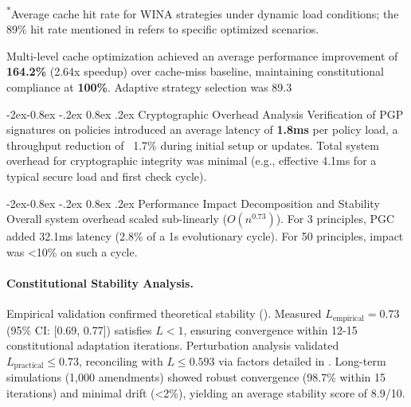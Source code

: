 \documentclass[manuscript,screen,9pt]{acmart}
\makeatletter
\renewcommand\subsubsection{\@startsection{subsubsection}{3}{\z@}%
  {-2ex\@plus -0.8ex \@minus -.2ex}%
  {0.8ex \@plus .2ex}%
  {\normalfont\normalsize\bfseries}}
\makeatother
\begin{document}
\begin{table}[!htb]
\begin{table}[htbp]
\begin{minipage}{\linewidth}\footnotesize \textsuperscript{*}Average cache hit rate for WINA strategies under dynamic load conditions; the 89\% hit rate mentioned in  refers to specific optimized scenarios.\end{minipage}
\end{table}
Multi-level cache optimization achieved an average performance improvement of \textbf{164.2\%} (2.64x speedup) over cache-miss baseline, maintaining constitutional compliance at \textbf{100\%}. Adaptive strategy selection was 89.3%

\subsubsection{Cryptographic Overhead Analysis}
\label{subsubsec:cryptographic_overhead}
Verification of PGP signatures on policies introduced an average latency of \textbf{1.8ms} per policy load, a throughput reduction of ~1.7\% during initial setup or updates. Total system overhead for cryptographic integrity was minimal (e.g., effective 4.1ms for a typical secure load and first check cycle).

\subsubsection{Performance Impact Decomposition and Stability}
\label{subsubsec:performance_impact_decomposition}
\sloppy Overall system overhead scaled sub-linearly ($O(n^{0.73})$). For 3 principles, PGC added 32.1ms latency (2.8\% of a 1s evolutionary cycle). For 50 principles, impact was <10\% on such a cycle. \fussy

\paragraph{Constitutional Stability Analysis.}
\label{subsec:stability_analysis}
Empirical validation confirmed theoretical stability (). Measured $L_{\text{empirical}} = 0.73$ (95\% CI: [0.69, 0.77]) satisfies $L < 1$, ensuring convergence within 12-15 constitutional adaptation iterations. Perturbation analysis validated $L_{\text{practical}} \leq 0.73$, reconciling with $L \leq 0.593$ via factors detailed in . Long-term simulations (1,000 amendments) showed robust convergence (98.7\% within 15 iterations) and minimal drift (<2\%), yielding an average stability score of 8.9/10.


\end{table}
\end{document}

